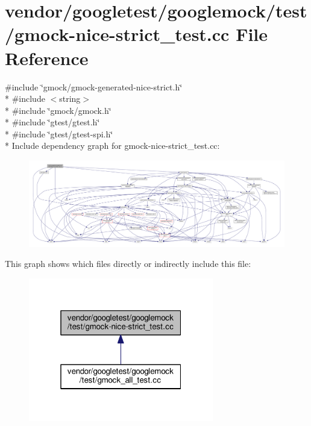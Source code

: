 \hypertarget{gmock-nice-strict__test_8cc}{}\section{vendor/googletest/googlemock/test/gmock-\/nice-\/strict\+\_\+test.cc File Reference}
\label{gmock-nice-strict__test_8cc}
{\ttfamily \#include \char`\"{}gmock/gmock-\/generated-\/nice-\/strict.\+h\char`\"{}}\\*
{\ttfamily \#include $<$string$>$}\\*
{\ttfamily \#include \char`\"{}gmock/gmock.\+h\char`\"{}}\\*
{\ttfamily \#include \char`\"{}gtest/gtest.\+h\char`\"{}}\\*
{\ttfamily \#include \char`\"{}gtest/gtest-\/spi.\+h\char`\"{}}\\*
Include dependency graph for gmock-\/nice-\/strict\+\_\+test.cc\+:
\nopagebreak
\begin{figure}[H]
\begin{center}
\leavevmode
\includegraphics[width=350pt]{gmock-nice-strict__test_8cc__incl}
\end{center}
\end{figure}
This graph shows which files directly or indirectly include this file\+:
\nopagebreak
\begin{figure}[H]
\begin{center}
\leavevmode
\includegraphics[width=229pt]{gmock-nice-strict__test_8cc__dep__incl}
\end{center}
\end{figure}
